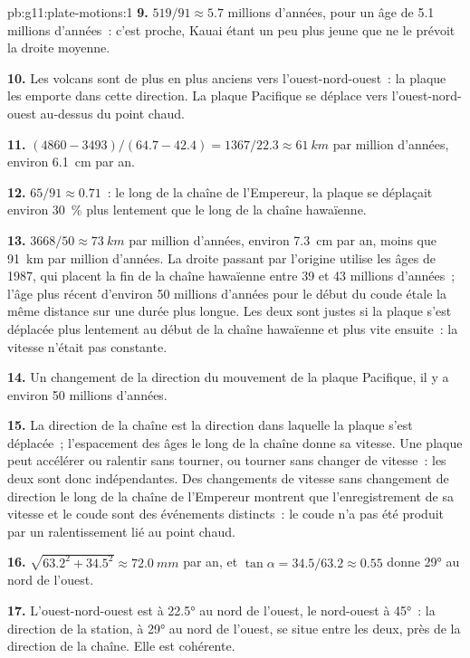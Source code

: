 \begin{solution}{pb:g11:plate-motions:1}
\textbf{9.} $519/91 \approx 5.7$ millions d'années, pour un âge de
\num{5.1} millions d'années~: c'est proche, Kauai étant un peu plus jeune
que ne le prévoit la droite moyenne.

\textbf{10.} Les volcans sont de plus en plus anciens vers
l'ouest-nord-ouest~: la plaque les emporte dans cette direction. La plaque
Pacifique se déplace vers l'ouest-nord-ouest au-dessus du point chaud.

\textbf{11.} $(4860 - 3493)/(64.7 - 42.4) = 1367/22.3 \approx \qty{61}{km}$
par million d'années, environ \qty{6.1}{cm} par an.

\textbf{12.} $65/91 \approx 0.71$~: le long de la chaîne de l'Empereur, la
plaque se déplaçait environ \qty{30}{\percent} plus lentement que le long de
la chaîne hawaïenne.

\textbf{13.} $3668/50 \approx \qty{73}{km}$ par million d'années, environ
\qty{7.3}{cm} par an, moins que \qty{91}{km} par million d'années. La droite
passant par l'origine utilise les âges de 1987, qui placent la fin de la
chaîne hawaïenne entre 39 et 43 millions d'années~; l'âge plus récent
d'environ 50 millions d'années pour le début du coude étale la même
distance sur une durée plus longue. Les deux sont justes si la plaque s'est
déplacée plus lentement au début de la chaîne hawaïenne et plus vite
ensuite~: la vitesse n'était pas constante.

\textbf{14.} Un changement de la direction du mouvement de la plaque
Pacifique, il y a environ 50 millions d'années.

\textbf{15.} La direction de la chaîne est la direction dans laquelle la
plaque s'est déplacée~; l'espacement des âges le long de la chaîne donne sa
vitesse. Une plaque peut accélérer ou ralentir sans tourner, ou tourner sans
changer de vitesse~: les deux sont donc indépendantes. Des changements de
vitesse sans changement de direction le long de la chaîne de l'Empereur
montrent que l'enregistrement de sa vitesse et le coude sont des événements
distincts~: le coude n'a pas été produit par un ralentissement lié au point
chaud.

\textbf{16.} $\sqrt{63.2^2 + 34.5^2} \approx \qty{72.0}{mm}$ par an, et
$\tan\alpha = 34.5/63.2 \approx 0.55$ donne \ang{29} au nord de l'ouest.

\textbf{17.} L'ouest-nord-ouest est à \ang{22.5} au nord de l'ouest, le
nord-ouest à \ang{45}~: la direction de la station, à \ang{29} au nord de
l'ouest, se situe entre les deux, près de la direction de la chaîne. Elle
est cohérente.


\end{solution}
